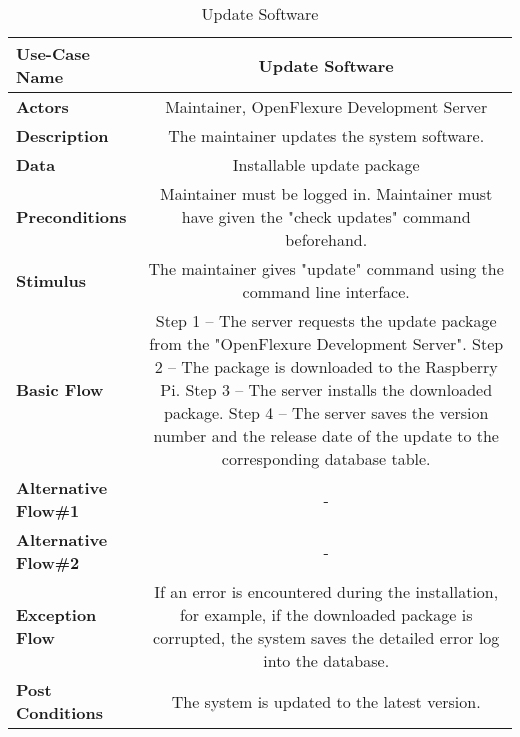 \begin{table}[H]
     \centering
     \begin{tabular}{|l|C|}
         \hline
          \textbf{Use-Case Name} & Update Software \\
         \hline
          \textbf{Actors} & Maintainer, OpenFlexure Development Server \\ 
         \hline
          \textbf{Description} & The maintainer updates the system software.\\ 
         \hline
          \textbf{Data} & Installable update package\\ 
         \hline
          \textbf{Preconditions} & 
          Maintainer must be logged in. \newline
          Maintainer must have given the "check updates" command beforehand.\\
         \hline
          \textbf{Stimulus} & The maintainer gives "update" command using the command line interface.\\ 
         \hline
          \textbf{Basic Flow} & 
          Step 1 -- The server requests the update package from the "OpenFlexure Development Server". \newline
          Step 2 -- The package is downloaded to the Raspberry Pi. \newline
          Step 3 -- The server installs the downloaded package. \newline
          Step 4 -- The server saves the version number and the release date of the update to the corresponding database table. \\
         \hline
          \textbf{Alternative Flow\#1} & - \\
         \hline
          \textbf{Alternative Flow\#2} & - \\
         \hline
          \textbf{Exception Flow} & If an error is encountered during the installation, for example, if the downloaded package is corrupted, the system saves the detailed error log into the database. \\
         \hline
          \textbf{Post Conditions} & The system is updated to the latest version. \\ 
         \hline
     \end{tabular}
     \caption{Update Software}
     \label{tab:update_software}
 \end{table}